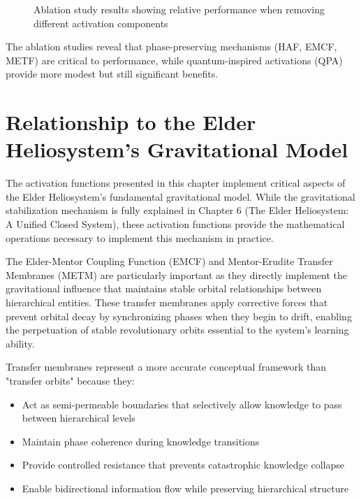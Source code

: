 \begin{figure}[h]
\centering
{}
\caption{Ablation study results showing relative performance when removing different activation components}
\end{figure}

The ablation studies reveal that phase-preserving mechanisms (HAF, EMCF, METF) are critical to performance, while quantum-inspired activations (QPA) provide more modest but still significant benefits.

\section{Relationship to the Elder Heliosystem's Gravitational Model}

The activation functions presented in this chapter implement critical aspects of the Elder Heliosystem's fundamental gravitational model. While the gravitational stabilization mechanism is fully explained in Chapter 6 (The Elder Heliosystem: A Unified Closed System), these activation functions provide the mathematical operations necessary to implement this mechanism in practice.

The Elder-Mentor Coupling Function (EMCF) and Mentor-Erudite Transfer Membranes (METM) are particularly important as they directly implement the gravitational influence that maintains stable orbital relationships between hierarchical entities. These transfer membranes apply corrective forces that prevent orbital decay by synchronizing phases when they begin to drift, enabling the perpetuation of stable revolutionary orbits essential to the system's learning ability.

Transfer membranes represent a more accurate conceptual framework than "transfer orbits" because they:
\begin{itemize}
    \item Act as semi-permeable boundaries that selectively allow knowledge to pass between hierarchical levels
    \item Maintain phase coherence during knowledge transitions
    \item Provide controlled resistance that prevents catastrophic knowledge collapse
    \item Enable bidirectional information flow while preserving hierarchical structure
\end{itemize}

